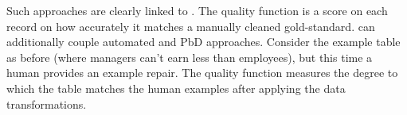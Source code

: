 Such approaches are clearly linked to \sys. The quality function is a score on each record on how accurately it matches a manually cleaned gold-standard. \sys can additionally couple automated and PbD approaches. 
Consider the example table as before (where managers can't earn less than employees), but this time  a human provides an example repair.
The quality function measures the degree to which the table matches the human examples after applying the data transformations.









